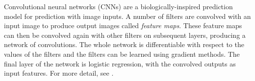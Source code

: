 \documentclass[fleqn,usenatbib,usedcolumn]{mnras}
\begin{document}
      Convolutional neural networks (CNNs) are a biologically-inspired
      prediction model for prediction with image inputs. A number of filters are
      convolved with an input image to produce output images called
      \emph{feature maps}. These feature maps can then be convolved again with
      other filters on subsequent layers, producing a network of convolutions.
      The whole network is differentiable with respect to the values of the
      filters and the filters can be learned using gradient methods. The final
      layer of the network is logistic regression, with the convolved outputs as
      input features. For more detail, see \citet[subsection II.A][]{lecun98}.

\end{document}
